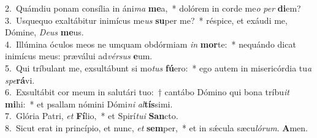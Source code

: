 {2.~}Quámdiu ponam consília in áni\textit{ma} \textbf{me}a,~* dolórem in corde me\textit{o} \textit{per} \textbf{di}em?\\
{3.~}Usquequo exaltábitur inimícus me\textit{us} \textbf{su}per me?~* réspice, et exáudi me, Dómine, \textit{De}\textit{us} \textbf{me}us.\\
{4.~}Illúmina óculos meos ne umquam obdórmiam \textit{in} \textbf{mor}te:~* nequándo dicat inimícus meus: præválui ad\textit{vér}\textit{sus} \textbf{e}um.\\
{5.~}Qui tríbulant me, exsultábunt si mo\textit{tus} \textbf{fú}ero:~* ego autem in misericórdia tu\textit{a} \textit{spe}\textbf{rá}vi.\\
{6.~}Exsultábit cor meum in salutári tuo:~† cantábo Dómino qui bona tríbu\textit{it} \textbf{mi}hi:~* et psallam nómini Dómi\textit{ni} \textit{al}\textbf{tís}simi.\\
{7.~}Glória Patri, \textit{et} \textbf{Fí}lio,~* et Spirí\textit{tu}\textit{i} \textbf{San}cto.\\
{8.~}Sicut erat in princípio, et nunc, \textit{et} \textbf{sem}per,~* et in sǽcula sæcu\textit{ló}\textit{rum}. \textbf{A}men.\\

